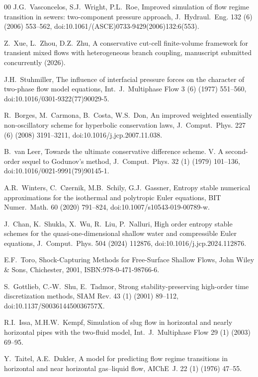 \begin{thebibliography}{00}
J.G.~Vasconcelos, S.J.~Wright, P.L.~Roe,
Improved simulation of flow regime transition in sewers: two-component
pressure approach,
J.~Hydraul.~Eng. 132 (6) (2006) 553--562,
doi:10.1061/(ASCE)0733-9429(2006)132:6(553).

Z.~Xue, L.~Zhou, D.Z.~Zhu,
A conservative cut-cell finite-volume framework for transient mixed flows with
heterogeneous branch coupling,
manuscript submitted concurrently (2026).

J.H.~Stuhmiller,
The influence of interfacial pressure forces on the character of two-phase
flow model equations,
Int.~J.~Multiphase Flow 3 (6) (1977) 551--560,
doi:10.1016/0301-9322(77)90029-5.

R.~Borges, M.~Carmona, B.~Costa, W.S.~Don,
An improved weighted essentially non-oscillatory scheme for hyperbolic
conservation laws,
J.~Comput.~Phys. 227 (6) (2008) 3191--3211,
doi:10.1016/j.jcp.2007.11.038.

B.~van Leer,
Towards the ultimate conservative difference scheme. V. A second-order
sequel to Godunov's method,
J.~Comput.~Phys. 32 (1) (1979) 101--136,
doi:10.1016/0021-9991(79)90145-1.

A.R.~Winters, C.~Czernik, M.B.~Schily, G.J.~Gassner,
Entropy stable numerical approximations for the isothermal and polytropic
Euler equations,
BIT Numer.~Math. 60 (2020) 791--824,
doi:10.1007/s10543-019-00789-w.

J.~Chan, K.~Shukla, X.~Wu, R.~Liu, P.~Nalluri,
High order entropy stable schemes for the quasi-one-dimensional shallow water
and compressible Euler equations,
J.~Comput.~Phys. 504 (2024) 112876,
doi:10.1016/j.jcp.2024.112876.

E.F.~Toro,
Shock-Capturing Methods for Free-Surface Shallow Flows,
John Wiley \& Sons, Chichester, 2001,
ISBN:978-0-471-98766-6.

S.~Gottlieb, C.-W.~Shu, E.~Tadmor,
Strong stability-preserving high-order time discretization methods,
SIAM Rev. 43 (1) (2001) 89--112,
doi:10.1137/S003614450036757X.

R.I.~Issa, M.H.W.~Kempf,
Simulation of slug flow in horizontal and nearly horizontal pipes with the
two-fluid model,
Int.~J.~Multiphase Flow 29 (1) (2003) 69--95.

Y.~Taitel, A.E.~Dukler,
A model for predicting flow regime transitions in horizontal and near
horizontal gas--liquid flow,
AIChE~J. 22 (1) (1976) 47--55.

\end{thebibliography}
